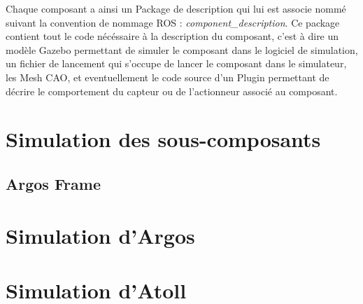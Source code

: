		Chaque composant a ainsi un \gls{Package} de description qui lui est associe nommé suivant la convention de nommage \gls{ROS} : \textit{component\_description}. Ce package contient tout le code nécéssaire à la description du composant, c'est à dire un modèle \gls{Gazebo} permettant de simuler le composant dans le logiciel de simulation, un fichier de lancement qui s'occupe de lancer le composant dans le simulateur, les \gls{Mesh CAO}, et eventuellement le code source d'un \gls{Plugin} permettant de décrire le comportement du capteur ou de l'actionneur associé au composant.
	\section{Simulation des sous-composants}
		\subsection{\gls{Argos} Frame}


	\section{Simulation d'Argos}

	\section{Simulation d'Atoll}